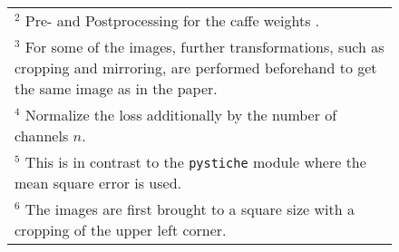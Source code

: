 \begin{figure}[H]
\begin{center}
\begin{rotate}{90}
\begin{tabular}{c|c|c}
\multicolumn{3}{l}{\scriptsize{$^2$ Pre- and Postprocessing for the caffe weights \cite{SZ2015}.}}\\
\multicolumn{3}{l}{\scriptsize{$^3$ For some of the images, further transformations, such as cropping and mirroring, are performed beforehand to get the same image as in the paper.}}\\
\multicolumn{3}{l}{\scriptsize{$^4$ Normalize the loss additionally by the number of channels $n$.}}\\
\multicolumn{3}{l}{\scriptsize{$^5$ This is in contrast to the \texttt{pystiche} module where the mean square error is used.}}\\
\multicolumn{3}{l}{\scriptsize{$^6$ The images are first brought to a square size with a cropping of the  upper left corner.}}
\end{tabular}
\end{rotate}
\label{tab:JAL2016_parameters}
\end{center}
\end{figure}
\clearpage
